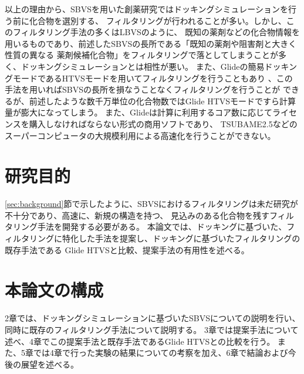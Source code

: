 以上の理由から、SBVSを用いた創薬研究ではドッキングシミュレーションを行う前に化合物を選別する、
フィルタリングが行われることが多い。しかし、このフィルタリング手法の多くはLBVSのように、
既知の薬剤などの化合物情報を用いるものであり、前述したSBVSの長所である「既知の薬剤や阻害剤と大きく性質の異なる
薬剤候補化合物」をフィルタリングで落としてしまうことが多く、ドッキングシミュレーションとは相性が悪い。
また、Glideの簡易ドッキングモードであるHTVSモードを用いてフィルタリングを行うこともあり
、この手法を用いればSBVSの長所を損なうことなくフィルタリングを行うことが
できるが、前述したような数千万単位の化合物数ではGlide HTVSモードですら計算量が膨大になってしまう。
また、Glideは計算に利用するコア数に応じてライセンスを購入しなければならない形式の商用ソフトであり、
TSUBAME2.5などのスーパーコンピュータの大規模利用による高速化を行うことができない。

\section{研究目的}
\ref{sec:background}節で示したように、SBVSにおけるフィルタリングは未だ研究が不十分であり、高速に、新規の構造を持つ、
見込みのある化合物を残すフィルタリング手法を開発する必要がある。
本論文では、ドッキングに基づいた、フィルタリングに特化した手法を提案し、ドッキングに基づいたフィルタリングの既存手法である
Glide HTVSと比較、提案手法の有用性を述べる。

\section{本論文の構成}
2章では、ドッキングシミュレーションに基づいたSBVSについての説明を行い、同時に既存のフィルタリング手法について説明する。
3章では提案手法について述べ、4章でこの提案手法と既存手法であるGlide HTVSとの比較を行う。
また、5章では4章で行った実験の結果についての考察を加え、6章で結論および今後の展望を述べる。


